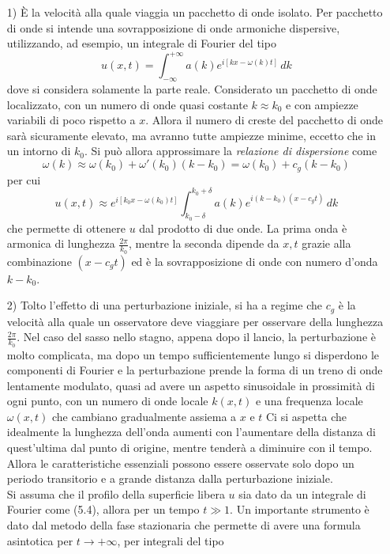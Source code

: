 \documentclass[a4paper,12pt, draft]{article}
\theoremstyle{break}
\numberwithin{equation}{section}
\begin{document}
\begin{itemize}
  \item[1)] È la velocità alla quale viaggia un pacchetto di onde isolato. Per pacchetto di onde si intende una sovrapposizione di onde armoniche dispersive, utilizzando, ad esempio, un integrale di Fourier del tipo
  \begin{equation}
    u(x,t) = \int_{-\infty}^{+\infty} a(k)e^{i[kx-\omega(k)t]} \, dk
  \end{equation}
  dove si considera solamente la parte reale. Considerato un pacchetto di onde localizzato, con un numero di onde quasi costante \(k \approx k_0\) e con ampiezze variabili di poco rispetto a \(x\). Allora il numero di creste del pacchetto di onde sarà sicuramente elevato, ma avranno tutte ampiezze minime, eccetto che in un intorno di \(k_0\). Si può allora approssimare la \emph{relazione di dispersione} come 
  \[
    \omega(k) \approx \omega(k_0) + \omega'(k_0)(k - k_0) = \omega(k_0) + c_g (k - k_0)
  \]
  per cui
  \begin{equation}
    u(x,t) \approx e^{i[k_0x - \omega(k_0)t]}\int_{k_0 - \delta}^{k_0 + \delta} a(k)e^{i(k-k_0)(x - c_g t)}\, dk
  \end{equation}
  che permette di ottenere \(u\) dal prodotto di due onde. La prima onda è armonica di lunghezza \(\frac{2\pi}{k_0}\), mentre la seconda dipende da \(x,t\) grazie alla combinazione \((x - c_g t)\) ed è la sovrapposizione di onde con numero d'onda \(k - k_0\).
  \item[2)] Tolto l'effetto di una perturbazione iniziale, si ha a regime che \(c_g\) è la velocità alla quale un osservatore deve viaggiare per osservare della lunghezza \(\frac{2\pi}{k_0}\). 
Nel caso del sasso nello stagno, appena dopo il lancio, la perturbazione è molto complicata, ma dopo un tempo sufficientemente lungo si disperdono le componenti di Fourier e la perturbazione prende la forma di un treno di onde lentamente modulato, quasi ad avere un aspetto sinusoidale in prossimità di ogni punto, con un numero di onde locale \(k(x,t)\) e una frequenza locale \(\omega(x,t)\) che cambiano gradualmente assiema a \(x \mbox{ e } t\) Ci si aspetta che idealmente la lunghezza dell'onda aumenti con l'aumentare della distanza di quest'ultima dal punto di origine, mentre tenderà a diminuire con il tempo. Allora le caratteristiche essenziali possono essere osservate solo dopo un periodo transitorio e a grande distanza dalla perturbazione iniziale. \\
Si assuma che il profilo della superficie libera \(u\) sia dato da un integrale di Fourier come (5.4), allora per un tempo \(t \gg 1\). Un importante strumento è dato dal metodo della fase stazionaria che permette di avere una formula asintotica per \(t \to +\infty\), per integrali del tipo

\end{itemize}
\end{document}
